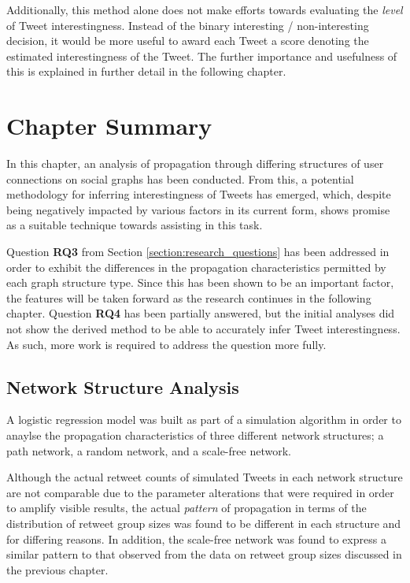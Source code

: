 Additionally, this method alone does not make efforts towards evaluating the \textit{level} of Tweet interestingness. Instead of the binary interesting / non-interesting decision, it would be more useful to award each Tweet a score denoting the estimated interestingness of the Tweet. The further importance and usefulness of this is explained in further detail in the following chapter.


\section{Chapter Summary}
In this chapter, an analysis of propagation through differing structures of user connections on social graphs has been conducted. From this, a potential methodology for inferring interestingness of Tweets has emerged, which, despite being negatively impacted by various factors in its current form, shows promise as a suitable technique towards assisting in this task. 

Question \textbf{RQ3} from Section \ref{section:research_questions} has been addressed in order to exhibit the differences in the propagation characteristics permitted by each graph structure type. Since this has been shown to be an important factor, the features will be taken forward as the research continues in the following chapter. Question \textbf{RQ4} has been partially answered, but the initial analyses did not show the derived method to be able to accurately infer Tweet interestingness. As such, more work is required to address the question more fully.


\subsection{Network Structure Analysis}
A logistic regression model was built as part of a simulation algorithm in order to anaylse the propagation characteristics of three different network structures; a path network, a random network, and a scale-free network. 

Although the actual retweet counts of simulated Tweets in each network structure are not comparable due to the parameter alterations that were required in order to amplify visible results, the actual \textit{pattern} of propagation in terms of the distribution of retweet group sizes was found to be different in each structure and for differing reasons. In addition, the scale-free network was found to express a similar pattern to that observed from the data on retweet group sizes discussed in the previous chapter.


